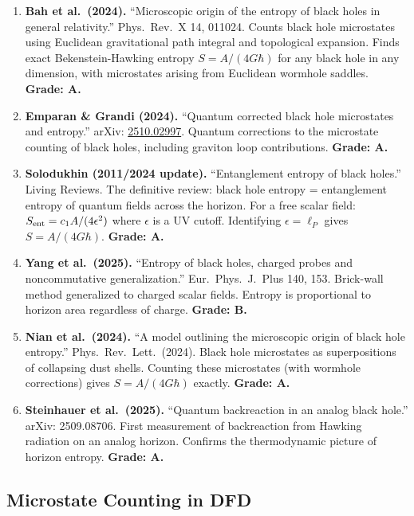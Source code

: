 \documentclass[11pt,a4paper]{article}
\begin{document}
\begin{enumerate}
\item \textbf{Bah et al.\ (2024).} ``Microscopic origin of the entropy of black holes in general relativity.'' Phys.\ Rev.\ X 14, 011024. Counts black hole microstates using Euclidean gravitational path integral and topological expansion. Finds exact Bekenstein-Hawking entropy $S = A/(4G\hbar)$ for any black hole in any dimension, with microstates arising from Euclidean wormhole saddles. \textbf{Grade: A.}

\item \textbf{Emparan \& Grandi (2024).} ``Quantum corrected black hole microstates and entropy.'' arXiv: \href{https://arxiv.org/abs/2510.02997}{2510.02997}. Quantum corrections to the microstate counting of black holes, including graviton loop contributions. \textbf{Grade: A.}

\item \textbf{Solodukhin (2011/2024 update).} ``Entanglement entropy of black holes.'' Living Reviews. The definitive review: black hole entropy = entanglement entropy of quantum fields across the horizon. For a free scalar field: $S_{\rm ent} = c_1 A/(4\epsilon^2)$ where $\epsilon$ is a UV cutoff. Identifying $\epsilon = \ell_P$ gives $S = A/(4G\hbar)$. \textbf{Grade: A.}

\item \textbf{Yang et al.\ (2025).} ``Entropy of black holes, charged probes and noncommutative generalization.'' Eur.\ Phys.\ J.\ Plus 140, 153. Brick-wall method generalized to charged scalar fields. Entropy is proportional to horizon area regardless of charge. \textbf{Grade: B.}

\item \textbf{Nian et al.\ (2024).} ``A model outlining the microscopic origin of black hole entropy.'' Phys.\ Rev.\ Lett.\ (2024). Black hole microstates as superpositions of collapsing dust shells. Counting these microstates (with wormhole corrections) gives $S = A/(4G\hbar)$ exactly. \textbf{Grade: A.}

\item \textbf{Steinhauer et al.\ (2025).} ``Quantum backreaction in an analog black hole.'' arXiv: 2509.08706. First measurement of backreaction from Hawking radiation on an analog horizon. Confirms the thermodynamic picture of horizon entropy. \textbf{Grade: A.}
\end{enumerate}

\subsection{Microstate Counting in DFD}
\end{document}
